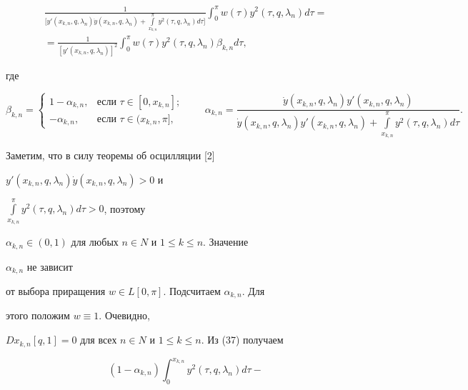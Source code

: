 \begin{pf}
\begin{multline}
\frac{1} 


{\Big[y'(x_{k,n},q,\lambda_n)\Dot y(x_{k,n},q,\lambda_n)+ 


\int\limits^\pi_{x_{k,n}}y^2(\tau,q,\lambda_n)d\tau\Big]} 


\int^\pi_0 w(\tau)y^2(\tau,q,\lambda_n)d\tau= \\


=\frac{1}{[y'(x_{k,n},q,\lambda_n)]^2} 


\int^\pi_0 w(\tau) y^2(\tau,q,\lambda_n)\beta_{k,n}d\tau, 


\end{multline} 


где 


$$ 


\beta_{k,n}= 


\begin{cases} 


1-\alpha_{k,n}, & \text{если }\tau\in[0,x_{k,n}];\\ 


-\alpha_{k,n}, & \text{если }\tau\in(x_{k,n},\pi], 


\end{cases} 


\qquad 


\alpha_{k,n}=\frac{\Dot y(x_{k,n},q,\lambda_n) 


y'(x_{k,n},q,\lambda_n)} 


{\Dot y(x_{k,n},q,\lambda_n)y'(x_{k,n},q,\lambda_n)+ 


\int\limits^\pi_{x_{k,n}}y^2(\tau,q,\lambda_n)d\tau}. 


$$ 


Заметим, что в силу теоремы об осцилляции [2] 


$y'(x_{k,n},q,\lambda_n)\Dot y(x_{k,n},q,\lambda_n)>0$ и 


$\int\limits^\pi_{x_{k,n}}y^2(\tau,q,\lambda_n)d\tau>0$, поэтому 


$\alpha_{k,n}\in(0,1)$ для любых $n\in N$ и $1\le k\le n$. Значение 


$\alpha_{k,n}$ не зависит 


от выбора приращения $w\in L[0,\pi]$. Подсчитаем $\alpha_{k,n}$. Для 


этого положим $w\equiv1$. Очевидно, 


$D x_{k,n}[q,1]=0$ для всех $n\in N$ и $1\le k\le n$. Из (37) получаем 


\begin{equation} 


(1-\alpha_{k,n})\int^{x_{k,n}}_0 y^2(\tau,q,\lambda_n)d\tau- 



\end{equation}
\end{pf}
